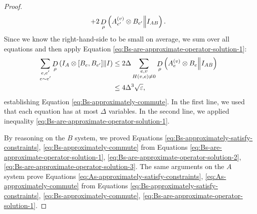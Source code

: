 \begin{proof}
\begin{equation}
	+2\mathop{D}\limits_{\rho}\left(A_{e'}^{(v)}\otimes B_{e'}\middle\| I_{AB}\right).
	\end{equation}
	Since we know the right-hand-side to be small on average, we sum over all equations and then apply Equation \eqref{eq:Bs-are-approximate-operator-solution-1}:
	\begin{align}
	\sum_{\substack{e,e'\\e\sim e'}}\mathop{D}\limits_{\rho}\left(I_A\otimes \left[B_e,B_{e'}\right]\middle\| I\right)
	&\leq
	2\Delta \sum_{\substack{e,v\\H(v,e)\neq 0}}
	\mathop{D}\limits_{\rho}\left(A_e^{(v)}\otimes B_e\middle\| I_{AB}\right)	
	\\
	&\leq 4\Delta^3\sqrt {\varepsilon}
	,
	\end{align}
	establishing Equation \eqref{eq:Bs-approximately-commute}.
	In the first line, we used that each equation has at most $\Delta$ variables. In the second line, we applied inequality \eqref{eq:Bs-are-approximate-operator-solution-1}.

	By reasoning on the $B$ system, we proved 
	Equations \eqref{eq:Bs-approximately-satisfy-constraints}, \eqref{eq:Bs-approximately-commute}
	from Equations \eqref{eq:Bs-are-approximate-operator-solution-1}, 
	\eqref{eq:Bs-are-approximate-operator-solution-2},
	\eqref{eq:Bs-are-approximate-operator-solution-3}. The same arguments on the $A$ system prove Equations \eqref{eq:As-approximately-satisfy-constraints}, \eqref{eq:As-approximately-commute}
	from Equations
	\eqref{eq:Bs-approximately-satisfy-constraints},
	\eqref{eq:Bs-approximately-commute},
	\eqref{eq:Bs-are-approximate-operator-solution-1}.

\end{proof}

